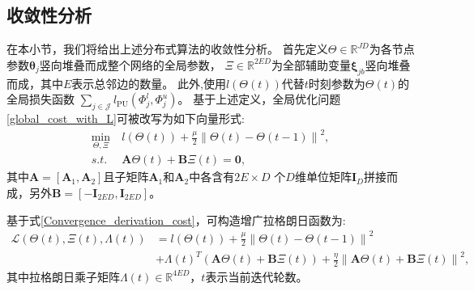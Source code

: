 \subsection{收敛性分析}\label{Convergence}
在本小节，我们将给出上述分布式算法的收敛性分析。
首先定义$\boldsymbol \varTheta \in \mathbb{R}^{JD}$为各节点参数$\boldsymbol\theta_j$竖向堆叠而成整个网络的全局参数，
$\boldsymbol\varXi \in \mathbb{R}^{2ED}$为全部辅助变量$\boldsymbol\xi_{jb}$竖向堆叠而成，其中$E$表示总邻边的数量。
此外,使用$l\left(\boldsymbol \varTheta\left(t\right)\right)$代替$t$时刻参数为$\boldsymbol \varTheta\left(t\right)$的全局损失函数
$\sum\limits_{j \in \mathcal{J}}l_{\mathrm{PU}}\left(\boldsymbol\varPhi_j^l,\boldsymbol\varPhi_j^u\right)$。
基于上述定义，全局优化问题\eqref{global_cost_with_L}可被改写为如下向量形式:
\begin{equation}\label{Convergence_derivation_cost}
    \begin{split}
        \mathop {\min}\limits_{\boldsymbol{\varTheta}, \boldsymbol \varXi}~&
        l\left(\boldsymbol{\varTheta}\left(t\right)\right) 
        + \frac{\mu}{2}\left\| {\boldsymbol{\varTheta}\left(t\right) - \boldsymbol{\varTheta}\left( {t - 1} \right)} \right\|^2, \\
        s.t.~& \boldsymbol A\boldsymbol{\varTheta}\left(t\right) + \boldsymbol B\boldsymbol \varXi\left(t\right) = \boldsymbol0,
    \end{split}
\end{equation}
其中$\boldsymbol A=\left[\boldsymbol A_1, \boldsymbol A_2\right]$且子矩阵$\boldsymbol A_1$和$\boldsymbol A_2$中各含有$2E\times D$
个$D$维单位矩阵$\boldsymbol I_D$拼接而成，另外$\boldsymbol B = \left[-\boldsymbol I_{2ED}, \boldsymbol I_{2ED}\right]$。

基于式\eqref{Convergence_derivation_cost}，可构造增广拉格朗日函数为:
\begin{equation}\label{ConvProof_1}
    \begin{split}
        \mathcal{L}\left(\boldsymbol{\varTheta}\left(t\right), \boldsymbol \varXi\left(t\right),
        \boldsymbol \varLambda\left(t\right)\right)
        &=l\left(\boldsymbol{\varTheta}\left(t\right)\right) 
        + \frac{\mu }{2}\left\| {\boldsymbol\varTheta\left(t\right) - \boldsymbol\varTheta\left( {t - 1} \right)} \right\|^2 \\
        &+ \boldsymbol \varLambda\left(t\right)^T \left(\boldsymbol A\boldsymbol{\varTheta}\left(t\right) + \boldsymbol B\boldsymbol \varXi\left(t\right)\right)
        + \frac{\eta}{2}\left\|\boldsymbol A\boldsymbol{\varTheta}\left(t\right) + \boldsymbol B\boldsymbol \varXi\left(t\right)\right\|^2,
    \end{split}
\end{equation}
其中拉格朗日乘子矩阵$\boldsymbol\varLambda\left(t\right)\in\mathbb{R}^{4ED}$，$t$表示当前迭代轮数。

